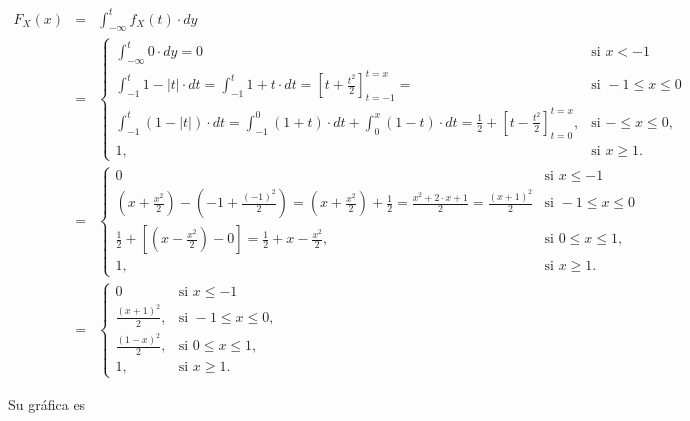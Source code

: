\documentclass[
]{article}
\begin{document}
\begin{eqnarray*}
F_X(x)&=&\int_{-\infty}^t f_X(t)\cdot  dy\\ &=&
\left\{
\begin{array}{ll}
\int_{-\infty}^t 0\cdot dy=0 & \mbox{si } x<-1\\
\int_{-1}^t  1-|t| \cdot dt= \int_{-1}^t  1+t \cdot dt=
\left[t+\frac{t^2}{2}\right]_{t=-1}^{t=x}= & \mbox{si } -1\leq x\leq 0\\ 
\int_{-1}^t  (1-|t|) \cdot dt= \int_{-1}^0  (1+t)\cdot dt+
\int_{0}^x  (1-t) \cdot dt =\frac{1}{2} + 
\left[t-\frac{t^2}{2}\right]_{t=0}^{t=x}, & \mbox{si } -\leq x\leq 0,\\ 
1, & \mbox{si } x\geq 1.
\end{array}\right.
\\
&=& 
\left\{
\begin{array}{ll}
0 & \mbox{si } x\leq -1\\
\left(x+\frac{x^2}{2}\right)- \left(-1+\frac{(-1)^2}{2}\right)=
\left(x+\frac{x^2}{2}\right)+ \frac{1}{2}=\frac{x^2+2\cdot x+1}{2}=
\frac{(x+1)^2}{2} & \mbox{si } -1\leq x\leq 0\\ 
\frac{1}{2}+ \left[\left(x-\frac{x^2}{2}\right)- 0\right]=
\frac{1}{2}+x-\frac{x^2}{2}, & \mbox{si } 0\leq x\leq 1,\\ 
1, & \mbox{si } x\geq 1.
\end{array}\right.
\\
&=&
\left\{
\begin{array}{ll}
0 & \mbox{si } x\leq -1\\
\frac{(x+1)^2}{2}, & \mbox{si } -1\leq x \leq 0,\\ 
\frac{(1-x)^2}{2}, & \mbox{si } 0\leq x\leq 1,\\ 
1, & \mbox{si } x\geq 1.
\end{array}\right.
\end{eqnarray*}

Su gráfica es
\end{document}

